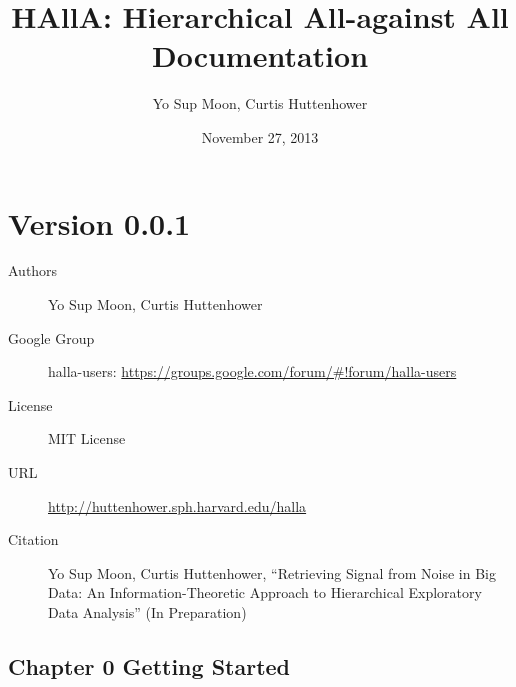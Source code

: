 \documentclass[letterpaper,10pt,english]{sphinxmanual}
\title{HAllA: Hierarchical All-against All Documentation}
\date{November 27, 2013}
\author{Yo Sup Moon, Curtis Huttenhower}
\begin{document}
\maketitle
\tableofcontents
{}\label{index::doc}



\chapter{Version 0.0.1}
\label{index:halla-hierarchical-all-against-all-association-testing}\label{index:version-0-0-1}\begin{description}
\item[{Authors}] \leavevmode
Yo Sup Moon, Curtis Huttenhower

\item[{Google Group}] \leavevmode
halla-users: \href{https://groups.google.com/forum/\#!forum/halla-users}{https://groups.google.com/forum/\#!forum/halla-users}

\item[{License}] \leavevmode
MIT License

\item[{URL}] \leavevmode
\href{http://huttenhower.sph.harvard.edu/halla}{http://huttenhower.sph.harvard.edu/halla}

\item[{Citation}] \leavevmode
Yo Sup Moon, Curtis Huttenhower, ``Retrieving Signal from Noise in Big Data: An Information-Theoretic Approach to Hierarchical Exploratory Data Analysis'' (In Preparation)

\end{description}


\section{Chapter 0 Getting Started}
\label{index:chapter-0-getting-started}
\end{document}
